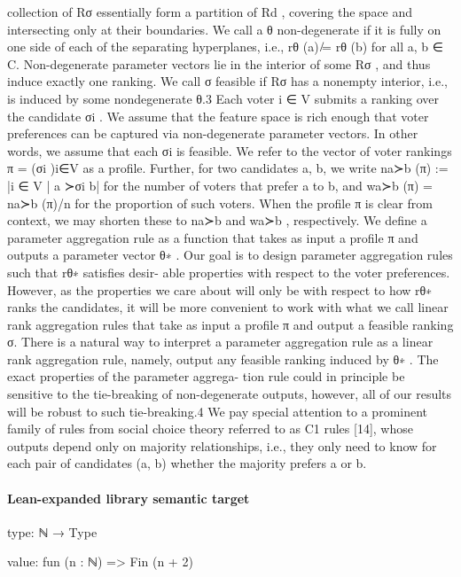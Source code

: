 \documentclass[10pt]{article}
\begin{document}
\begin{ReviewVerbatim}
collection of {Rσ } essentially form a partition of Rd , covering the space and intersecting only at
their boundaries.
We call a θ non-degenerate if it is fully on one side of each of the separating hyperplanes, i.e.,
rθ (a) ̸= rθ (b) for all a, b ∈ C. Non-degenerate parameter vectors lie in the interior of some Rσ ,
and thus induce exactly one ranking. We call σ feasible if Rσ has a nonempty interior, i.e., is induced
by some nondegenerate θ.3
Each voter i ∈ V submits a ranking over the candidate σi . We assume that the feature space is
rich enough that voter preferences can be captured via non-degenerate parameter vectors. In other
words, we assume that each σi is feasible. We refer to the vector of voter rankings π = (σi )i∈V as
a profile. Further, for two candidates a, b, we write na≻b (π) := |{i ∈ V | a ≻σi b}| for the number
of voters that prefer a to b, and wa≻b (π) = na≻b (π)/n for the proportion of such voters. When the
profile π is clear from context, we may shorten these to na≻b and wa≻b , respectively.
We define a parameter aggregation rule as a function that takes as input a profile π and outputs a
parameter vector θ∗ . Our goal is to design parameter aggregation rules such that rθ∗ satisfies desir-
able properties with respect to the voter preferences. However, as the properties we care about will
only be with respect to how rθ∗ ranks the candidates, it will be more convenient to work with what
we call linear rank aggregation rules that take as input a profile π and output a feasible ranking σ.
There is a natural way to interpret a parameter aggregation rule as a linear rank aggregation rule,
namely, output any feasible ranking induced by θ∗ . The exact properties of the parameter aggrega-
tion rule could in principle be sensitive to the tie-breaking of non-degenerate outputs, however, all
of our results will be robust to such tie-breaking.4
We pay special attention to a prominent family of rules from social choice theory referred to as C1
rules [14], whose outputs depend only on majority relationships, i.e., they only need to know for
each pair of candidates (a, b) whether the majority prefers a or b.
\end{ReviewVerbatim}



\paragraph{Lean-expanded library semantic target}
\begin{ReviewVerbatim}
type:
ℕ → Type

value:
fun (n : ℕ) => Fin (n + 2)
\end{ReviewVerbatim}
\end{document}
